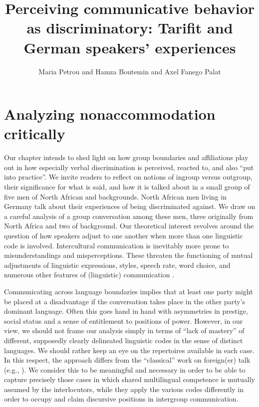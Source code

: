 \documentclass[output=paper,colorlinks,citecolor=brown]{langscibook}
\author{Maria Petrou\orcid{}\affiliation{} and Hamza Boutemin\orcid{}\affiliation{} and Axel Fanego Palat\orcid{}\affiliation{}}
\title[Perceiving communicative behavior as discriminatory]{Perceiving communicative behavior as discriminatory: Tarifit and German speakers' experiences}
\begin{document}
\maketitle

\section{Analyzing nonaccommodation critically}\label{CH1.1.ss.1}

Our chapter intends to shed light on how group boundaries and affiliations play out in how especially verbal discrimination is perceived, reacted to, and also ``put into practice''. We invite readers to reflect on notions of ingroup versus outgroup, their significance for what is said, and how it is talked about in a small group of five men of North African and  backgrounds. North African men living in Germany talk about their experiences of being discriminated against. We draw on a careful analysis of a group conversation among these men, three originally from North Africa and two of  background. Our theoretical interest revolves around the question of how speakers adjust to one another when more than one linguistic code is involved. Intercultural communication is inevitably more prone to misunderstandings and misperceptions. These threaten the functioning of mutual adjustments of linguistic expressions, styles, speech rate, word choice, and numerous other features of (linguistic) communication \citep{giles_bourhis_taylor1977}.

Communicating across language boundaries implies that at least one party might be placed at a disadvantage if the conversation takes place in the other party's dominant language. Often this goes hand in hand with asymmetries in prestige, social status and a sense of entitlement to positions of power. However, in our view, we should not frame our analysis simply in terms of ``lack of mastery'' of different, supposedly clearly delineated linguistic codes in the sense of distinct languages. We should rather keep an eye on the repertoires available in each case. In this respect, the approach differs from the ``classical'' work on foreign(er) talk (e.g., \citealt{zuengler1991}). We consider this to be meaningful and necessary in order to be able to capture precisely those cases in which shared multilingual competence is mutually assumed by the interlocutors, while they apply the various codes differently in order to occupy and claim discursive positions in intergroup communication.
\end{document}
